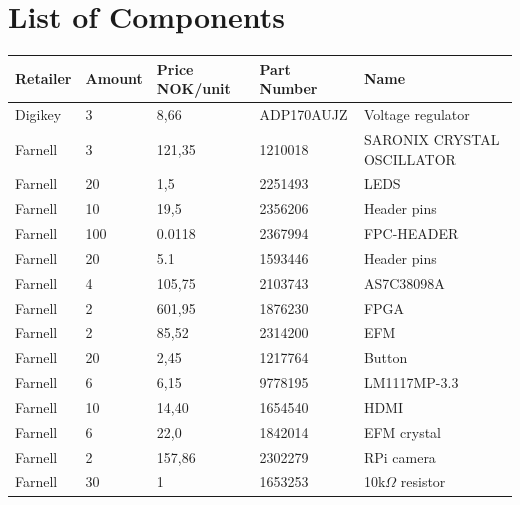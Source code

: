\chapter{List of Components}
\label{app:components}
\begin{table}[h]
    \centering
    \begin{tabular}{lllll}
        Retailer    & Amount & Price NOK/unit & Part Number            & Name                        \\
        \hline
        Digikey     & 3      & 8,66          & ADP170AUJZ & Voltage regulator           \\
        Farnell     & 3      & 121,35        & 1210018                & SARONIX  CRYSTAL OSCILLATOR \\
        Farnell     & 20     & 1,5           & 2251493                & LEDS                        \\
        Farnell     & 10     & 19,5          & 2356206                & Header pins                 \\
        Farnell     & 100    & 0.0118        & 2367994                & FPC-HEADER                  \\
        Farnell     & 20     & 5.1           & 1593446                & Header pins                 \\
        Farnell     & 4      & 105,75        & 2103743                & AS7C38098A                  \\
        Farnell     & 2      & 601,95        & 1876230                & FPGA                        \\
        Farnell     & 2      & 85,52         & 2314200                & EFM                         \\
        Farnell     & 20     & 2,45          & 1217764                & Button                      \\
        Farnell     & 6      & 6,15          & 9778195                & LM1117MP-3.3                \\
        Farnell     & 10     & 14,40         & 1654540                & HDMI                        \\
        Farnell     & 6      & 22,0          & 1842014                & EFM crystal                 \\
        Farnell     & 2      & 157,86        & 2302279                & RPi camera                  \\
        Farnell     & 30     & 1             & 1653253                & 10k$\Omega$ resistor            \\

\end{tabular}
\end{table}
